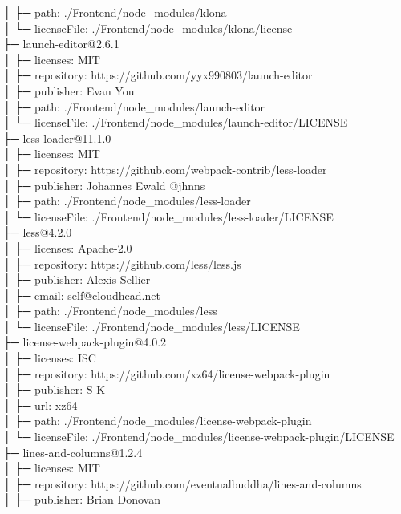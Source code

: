 │  ├─ path: ./Frontend/node\_modules/klona\\
│  └─ licenseFile: ./Frontend/node\_modules/klona/license\\
├─ launch-editor@2.6.1\\
│  ├─ licenses: MIT\\
│  ├─ repository: https://github.com/yyx990803/launch-editor\\
│  ├─ publisher: Evan You\\
│  ├─ path: ./Frontend/node\_modules/launch-editor\\
│  └─ licenseFile: ./Frontend/node\_modules/launch-editor/LICENSE\\
├─ less-loader@11.1.0\\
│  ├─ licenses: MIT\\
│  ├─ repository: https://github.com/webpack-contrib/less-loader\\
│  ├─ publisher: Johannes Ewald @jhnns\\
│  ├─ path: ./Frontend/node\_modules/less-loader\\
│  └─ licenseFile: ./Frontend/node\_modules/less-loader/LICENSE\\
├─ less@4.2.0\\
│  ├─ licenses: Apache-2.0\\
│  ├─ repository: https://github.com/less/less.js\\
│  ├─ publisher: Alexis Sellier\\
│  ├─ email: self@cloudhead.net\\
│  ├─ path: ./Frontend/node\_modules/less\\
│  └─ licenseFile: ./Frontend/node\_modules/less/LICENSE\\
├─ license-webpack-plugin@4.0.2\\
│  ├─ licenses: ISC\\
│  ├─ repository: https://github.com/xz64/license-webpack-plugin\\
│  ├─ publisher: S K\\
│  ├─ url: xz64\\
│  ├─ path: ./Frontend/node\_modules/license-webpack-plugin\\
│  └─ licenseFile: ./Frontend/node\_modules/license-webpack-plugin/LICENSE\\
├─ lines-and-columns@1.2.4\\
│  ├─ licenses: MIT\\
│  ├─ repository: https://github.com/eventualbuddha/lines-and-columns\\
│  ├─ publisher: Brian Donovan\\
